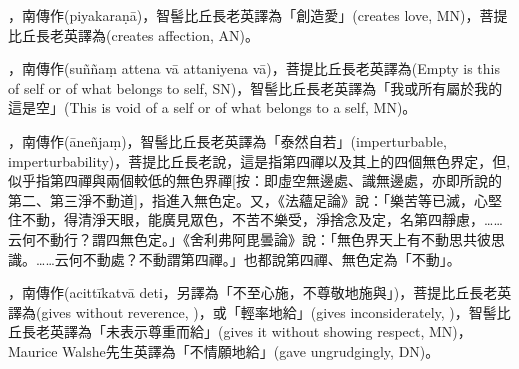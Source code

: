\startitemgroup[noteitems]
\item{}，南傳作(piyakaraṇā)，智髻比丘長老英譯為「創造愛」(creates love, MN)，菩提比丘長老英譯為(creates affection, AN)。
\stopitemgroup

\startitemgroup[noteitems]
\item{}，南傳作(suññaṃ attena vā attaniyena vā)，菩提比丘長老英譯為(Empty is this of self or of what belongs to self, SN)，智髻比丘長老英譯為「我或所有屬於我的這是空」(This is void of a self or of what belongs to a self, MN)。
\stopitemgroup

\startitemgroup[noteitems]
\item{}，南傳作(āneñjaṃ)，智髻比丘長老英譯為「泰然自若」(imperturbable, imperturbability)，菩提比丘長老說，這是指第四禪以及其上的四個無色界定，但, 似乎指第四禪與兩個較低的無色界禪[按：即虛空無邊處、識無邊處，亦即所說的第二、第三淨不動道]，指進入無色定。又，《法蘊足論》說：「樂苦等已滅，心堅住不動，得清淨天眼，能廣見眾色，不苦不樂受，淨捨念及定，名第四靜慮，……云何不動行？謂四無色定。」《舍利弗阿毘曇論》說：「無色界天上有不動思共彼思識。……云何不動處？不動謂第四禪。」也都說第四禪、無色定為「不動」。
\stopitemgroup

\startitemgroup[noteitems]
\item{}，南傳作(acittīkatvā deti，另譯為「不至心施，不尊敬地施與」)，菩提比丘長老英譯為(gives without reverence, )，或「輕率地給」(gives inconsiderately, )，智髻比丘長老英譯為「未表示尊重而給」(gives it without showing respect, MN)，Maurice Walshe先生英譯為「不情願地給」(gave ungrudgingly, DN)。
\stopitemgroup

